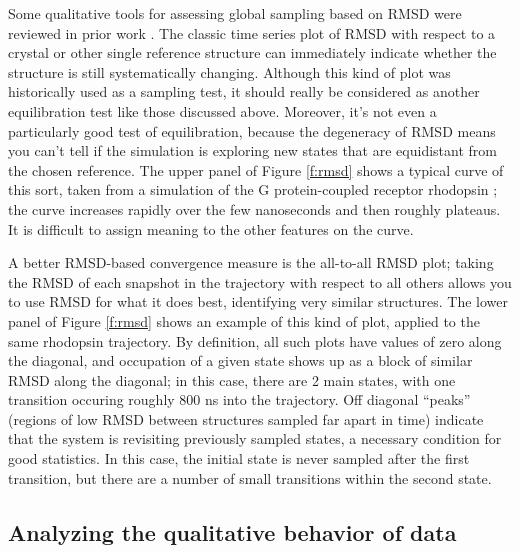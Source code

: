 Some qualitative tools for assessing global sampling based on RMSD were reviewed
in prior work \cite{Grossfield2009}.   The classic time series plot of RMSD with
respect to a crystal or other single reference structure can immediately
indicate whether the structure is still systematically changing.  Although this
kind of plot was historically used as a sampling test, it should really be
considered as another equilibration test like those discussed above.  Moreover,
it's not even a particularly good test of equilibration, because the degeneracy
of RMSD means you can't tell if the simulation is exploring new states that are
equidistant from the chosen reference.  The upper panel of Figure \ref{f:rmsd}
shows a typical curve of this sort, taken from a simulation of the G
protein-coupled receptor rhodopsin \cite{Grossfield-2015}; the curve increases
rapidly over the few nanoseconds and then roughly plateaus.  It is difficult to
assign meaning to the other features on the curve.

A better RMSD-based convergence measure is the all-to-all RMSD plot; taking the
RMSD of each snapshot in the trajectory with respect to all others allows you to
use RMSD for what it does best, identifying very similar structures.  The lower
panel of Figure \ref{f:rmsd} shows an example of this kind of plot, applied to
the same rhodopsin trajectory.  By definition, all such plots have values of zero
along the diagonal, and occupation of a given state shows up as a block of
similar RMSD along the diagonal; in this case, there are 2 main states, with one
transition occuring roughly 800 ns into the trajectory.  Off diagonal ``peaks''
(regions of low RMSD between structures sampled far apart in time) indicate that
the system is revisiting previously sampled states, a necessary condition for
good statistics.  In this case, the initial state is never sampled after the
first transition, but there are a number of small transitions within the second
state.

\subsection{Analyzing the qualitative behavior of data}

